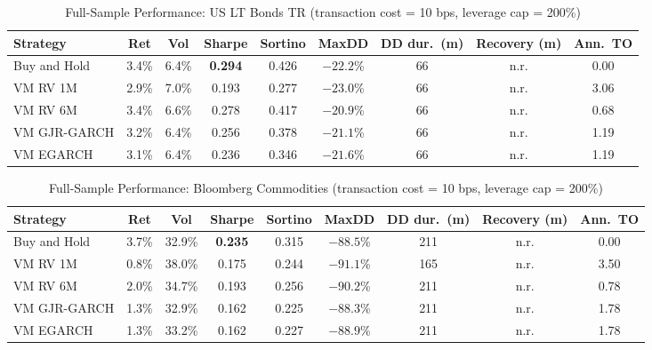 \documentclass[12pt, a4paper]{article}
\begin{document}
\begin{table}[H]
  \centering
  \caption{Full-Sample Performance: US LT Bonds TR (transaction cost = 10 bps, leverage cap = 200\%)}
  \label{tab:perf_bonds}
  \footnotesize
  \begin{tabular}{lcccccccc}
    \toprule
    \textbf{Strategy} & \textbf{Ret} & \textbf{Vol} & \textbf{Sharpe} & \textbf{Sortino}
                      & \textbf{MaxDD} & \textbf{DD dur.\ (m)} & \textbf{Recovery (m)}
                      & \textbf{Ann.\ TO} \\
    \midrule
    Buy and Hold      & 3.4\% & 6.4\% & \textbf{0.294} & 0.426 & $-22.2$\% & 66 & n.r. & 0.00 \\
    VM RV 1M          & 2.9\% & 7.0\% & 0.193          & 0.277 & $-23.0$\% & 66 & n.r. & 3.06 \\
    VM RV 6M          & 3.4\% & 6.6\% & 0.278          & 0.417 & $-20.9$\% & 66 & n.r. & 0.68 \\
    VM GJR-GARCH      & 3.2\% & 6.4\% & 0.256          & 0.378 & $-21.1$\% & 66 & n.r. & 1.19 \\
    VM EGARCH         & 3.1\% & 6.4\% & 0.236          & 0.346 & $-21.6$\% & 66 & n.r. & 1.19 \\
    \bottomrule
  \end{tabular}
\end{table}

\begin{table}[H]
  \centering
  \caption{Full-Sample Performance: Bloomberg Commodities (transaction cost = 10 bps, leverage cap = 200\%)}
  \label{tab:perf_comm}
  \footnotesize
  \begin{tabular}{lcccccccc}
    \toprule
    \textbf{Strategy} & \textbf{Ret} & \textbf{Vol} & \textbf{Sharpe} & \textbf{Sortino}
                      & \textbf{MaxDD} & \textbf{DD dur.\ (m)} & \textbf{Recovery (m)}
                      & \textbf{Ann.\ TO} \\
    \midrule
    Buy and Hold      & 3.7\% & 32.9\% & \textbf{0.235} & 0.315 & $-88.5$\% & 211 & n.r. & 0.00 \\
    VM RV 1M          & 0.8\% & 38.0\% & 0.175          & 0.244 & $-91.1$\% & 165 & n.r. & 3.50 \\
    VM RV 6M          & 2.0\% & 34.7\% & 0.193          & 0.256 & $-90.2$\% & 211 & n.r. & 0.78 \\
    VM GJR-GARCH      & 1.3\% & 32.9\% & 0.162          & 0.225 & $-88.3$\% & 211 & n.r. & 1.78 \\
    VM EGARCH         & 1.3\% & 33.2\% & 0.162          & 0.227 & $-88.9$\% & 211 & n.r. & 1.78 \\
    \bottomrule
  \end{tabular}
\end{table}
\end{document}

